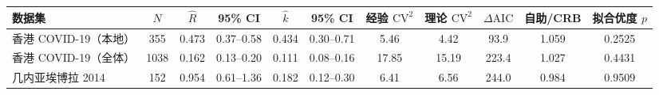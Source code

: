 \begin{tabular}{lcc c c c cc c c c}
\toprule
数据集 & $N$ & $\hat R$ & 95\% CI & $\hat k$ & 95\% CI & 经验 $\text{CV}^2$ & 理论 $\text{CV}^2$ & $\Delta\text{AIC}$ & 自助/CRB & 拟合优度 $p$ \\
\midrule
香港 COVID-19（本地） & 355 & 0.473 & 0.37--0.58 & 0.434 & 0.30--0.71 & 5.46 & 4.42 & 93.9 & 1.059 & 0.2525 \\
香港 COVID-19（全体） & 1038 & 0.162 & 0.13--0.20 & 0.111 & 0.08--0.16 & 17.85 & 15.19 & 223.4 & 1.027 & 0.4431 \\
几内亚埃博拉 2014 & 152 & 0.954 & 0.61--1.36 & 0.182 & 0.12--0.30 & 6.41 & 6.56 & 244.0 & 0.984 & 0.9509 \\
\bottomrule
\end{tabular}
